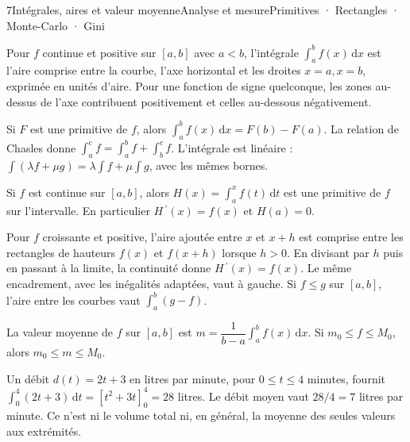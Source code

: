 \begin{ouverture}[integrale]{7}{Intégrales, aires et valeur moyenne}{Analyse et mesure}{Primitives · Rectangles · Monte-Carlo · Gini}
\end{ouverture}
\essentiel

Pour $f$ continue et positive sur $[a,b]$ avec $a<b$, l'intégrale $\int_a^bf(x)\,\mathrm dx$ est l'aire comprise entre la courbe, l'axe horizontal et les droites $x=a,x=b$, exprimée en unités d'aire.
Pour une fonction de signe quelconque, les zones au-dessus de l'axe contribuent positivement et celles au-dessous négativement.
\begin{propriete}
Si $F$ est une primitive de $f$, alors $\int_a^bf(x)\,\mathrm dx=F(b)-F(a)$.
La relation de Chasles donne $\int_a^cf=\int_a^bf+\int_b^cf$.
L'intégrale est linéaire : $\int(\lambda f+\mu g)=\lambda\int f+\mu\int g$, avec les mêmes bornes.
\end{propriete}
\begin{theoreme}
Si $f$ est continue sur $[a,b]$, alors $H(x)=\int_a^xf(t)\,\mathrm dt$ est une primitive de $f$ sur l'intervalle. En particulier $H\,\!^{\prime}(x)=f(x)$ et $H(a)=0$.
\end{theoreme}
Pour $f$ croissante et positive, l'aire ajoutée entre $x$ et $x+h$ est comprise entre les rectangles de hauteurs $f(x)$ et $f(x+h)$ lorsque $h>0$.
En divisant par $h$ puis en passant à la limite, la continuité donne $H\,\!^{\prime}(x)=f(x)$. Le même encadrement, avec les inégalités adaptées, vaut à gauche.
Si $f\leq g$ sur $[a,b]$, l'aire entre les courbes vaut $\int_a^b(g-f)$.
\begin{definition}
La valeur moyenne de $f$ sur $[a,b]$ est
$m=\dfrac1{b-a}\int_a^bf(x)\,\mathrm dx$.
Si $m_0\leq f\leq M_0$, alors $m_0\leq m\leq M_0$.
\end{definition}
\begin{exemple}[Débit]
Un débit $d(t)=2t+3$ en litres par minute, pour $0\leq t\leq4$ minutes, fournit
$\int_0^4(2t+3)\,\mathrm dt=[t^2+3t]_0^4=28$ litres.
Le débit moyen vaut $28/4=7$ litres par minute. Ce n'est ni le volume total ni, en général, la moyenne des seules valeurs aux extrémités.
\end{exemple}
